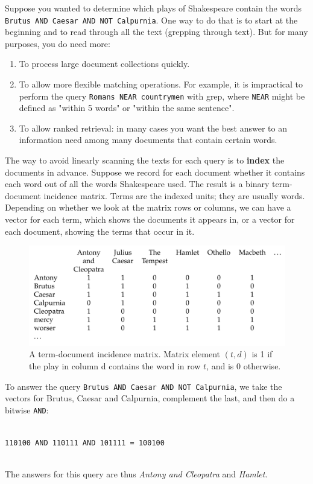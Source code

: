 \documentclass[letterpaper,11pt]{article}
\newcommand{\code}[1]{\texttt{#1}}
\begin{document}
Suppose you wanted to determine which plays of Shakespeare contain the words \code{Brutus AND Caesar AND NOT Calpurnia}. One way to do that is to start at the beginning and to read through all the text (grepping through text). But for many purposes, you do need more:
\begin{enumerate}
    \item To process large document collections quickly.
    \item To allow more flexible matching operations. For example, it is impractical to perform the query \code{Romans NEAR countrymen} with grep, where \code{NEAR} might be defined as "within 5 words" or "within the same sentence".
    \item To allow ranked retrieval: in many cases you want the best answer to an information need among many documents that contain certain words.
\end{enumerate}
The way to avoid linearly scanning the texts for each query is to \textbf{index} the documents in advance. Suppose we record for each document whether it contains each word out of all the words Shakespeare used. The result is a binary term-document incidence matrix. Terms are the indexed units; they are usually words. Depending on whether we look at the matrix rows or columns, we can have a vector for each term, which shows the documents it appears in, or a vector for each document, showing the terms that occur in it.
\begin{figure}[H]
    \centering
    \includegraphics[scale=0.45]{sect1/figure1_1.png}
    \caption{A term-document incidence matrix. Matrix element $(t, d)$ is 1 if the play in column d contains the word in row $t$, and is 0 otherwise.}
\end{figure}
To answer the query \code{Brutus AND Caesar AND NOT Calpurnia}, we take the vectors for Brutus, Caesar and Calpurnia, complement the last, and then do a bitwise \code{AND}:\\
~\\
\centerline{\code{110100 AND 110111 AND 101111 = 100100}}
~\\
The answers for this query are thus \textit{Antony and Cleopatra} and \textit{Hamlet}.
\end{document}
